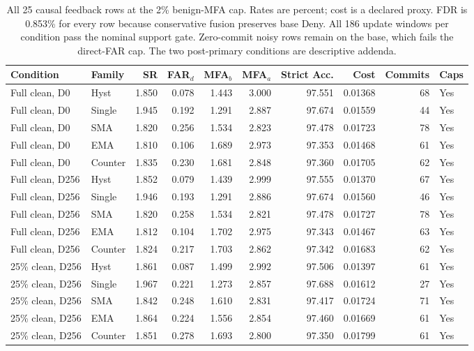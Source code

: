 \begin{table}[!htbp]
\centering
\caption{All 25 causal feedback rows at the 2\% benign-MFA cap. Rates are percent; cost is a declared proxy. FDR is 0.853\% for every row because conservative fusion preserves base Deny. All 186 update windows per condition pass the nominal support gate. Zero-commit noisy rows remain on the base, which fails the direct-FAR cap. The two post-primary conditions are descriptive addenda.}
\label{tab:supp_dynamic_2}
\scriptsize
\setlength{\tabcolsep}{3pt}
\begin{tabular}{llrrrrrrrl}
\toprule
Condition & Family & SR & FAR$_d$ & MFA$_b$ & MFA$_a$ & Strict Acc. & Cost & Commits & Caps\\
\midrule
Full clean, D0 & Hyst & 1.850 & 0.078 & 1.443 & 3.000 & 97.551 & 0.01368 & 68 & Yes \\
Full clean, D0 & Single & 1.945 & 0.192 & 1.291 & 2.887 & 97.674 & 0.01559 & 44 & Yes \\
Full clean, D0 & SMA & 1.820 & 0.256 & 1.534 & 2.823 & 97.478 & 0.01723 & 78 & Yes \\
Full clean, D0 & EMA & 1.810 & 0.106 & 1.689 & 2.973 & 97.353 & 0.01468 & 61 & Yes \\
Full clean, D0 & Counter & 1.835 & 0.230 & 1.681 & 2.848 & 97.360 & 0.01705 & 62 & Yes \\
Full clean, D256 & Hyst & 1.852 & 0.079 & 1.439 & 2.999 & 97.555 & 0.01370 & 67 & Yes \\
Full clean, D256 & Single & 1.946 & 0.193 & 1.291 & 2.886 & 97.674 & 0.01560 & 46 & Yes \\
Full clean, D256 & SMA & 1.820 & 0.258 & 1.534 & 2.821 & 97.478 & 0.01727 & 78 & Yes \\
Full clean, D256 & EMA & 1.812 & 0.104 & 1.702 & 2.975 & 97.343 & 0.01467 & 63 & Yes \\
Full clean, D256 & Counter & 1.824 & 0.217 & 1.703 & 2.862 & 97.342 & 0.01683 & 62 & Yes \\
25\% clean, D256 & Hyst & 1.861 & 0.087 & 1.499 & 2.992 & 97.506 & 0.01397 & 61 & Yes \\
25\% clean, D256 & Single & 1.967 & 0.221 & 1.273 & 2.857 & 97.688 & 0.01612 & 27 & Yes \\
25\% clean, D256 & SMA & 1.842 & 0.248 & 1.610 & 2.831 & 97.417 & 0.01724 & 71 & Yes \\
25\% clean, D256 & EMA & 1.864 & 0.224 & 1.556 & 2.854 & 97.460 & 0.01669 & 61 & Yes \\
25\% clean, D256 & Counter & 1.851 & 0.278 & 1.693 & 2.800 & 97.350 & 0.01799 & 61 & Yes \\

\end{tabular}
\end{table}
